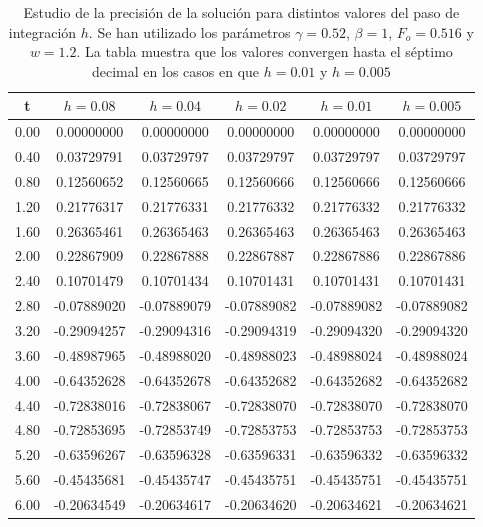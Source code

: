 \documentclass[11pt]{article}
\begin{document}
\begin{table}[h]
\centering
\begin{tabular}{|c|c|c|c|c|c|}
\hline
t & $h = 0.08$ & $h = 0.04$ & $h = 0.02$ & $h = 0.01$ & $h = 0.005$ \\
\hline
0.00 & 0.00000000 & 0.00000000 & 0.00000000 & 0.00000000 & 0.00000000 \\ 
0.40 & 0.03729791 & 0.03729797 & 0.03729797 & 0.03729797 & 0.03729797 \\ 
0.80 & 0.12560652 & 0.12560665 & 0.12560666 & 0.12560666 & 0.12560666 \\ 
1.20 & 0.21776317 & 0.21776331 & 0.21776332 & 0.21776332 & 0.21776332 \\ 
1.60 & 0.26365461 & 0.26365463 & 0.26365463 & 0.26365463 & 0.26365463 \\ 
2.00 & 0.22867909 & 0.22867888 & 0.22867887 & 0.22867886 & 0.22867886 \\ 
2.40 & 0.10701479 & 0.10701434 & 0.10701431 & 0.10701431 & 0.10701431 \\ 
2.80 & -0.07889020 & -0.07889079 & -0.07889082 & -0.07889082 & -0.07889082 \\ 
3.20 & -0.29094257 & -0.29094316 & -0.29094319 & -0.29094320 & -0.29094320 \\ 
3.60 & -0.48987965 & -0.48988020 & -0.48988023 & -0.48988024 & -0.48988024 \\ 
4.00 & -0.64352628 & -0.64352678 & -0.64352682 & -0.64352682 & -0.64352682 \\ 
4.40 & -0.72838016 & -0.72838067 & -0.72838070 & -0.72838070 & -0.72838070 \\ 
4.80 & -0.72853695 & -0.72853749 & -0.72853753 & -0.72853753 & -0.72853753 \\ 
5.20 & -0.63596267 & -0.63596328 & -0.63596331 & -0.63596332 & -0.63596332 \\ 
5.60 & -0.45435681 & -0.45435747 & -0.45435751 & -0.45435751 & -0.45435751 \\ 
6.00 & -0.20634549 & -0.20634617 & -0.20634620 & -0.20634621 & -0.20634621 \\ 
\hline
\end{tabular}
\caption{Estudio de la precisión de la solución para distintos valores del paso
de integración $h$. Se han utilizado los parámetros $\gamma=0.52$, $\beta=1$,
$F_o = 0.516$ y $w=1.2$. La tabla muestra que los valores convergen hasta el
séptimo decimal en los casos en que $h = 0.01$ y $h=0.005$}
\label{tab:precision}
\end{table}
\end{document}
